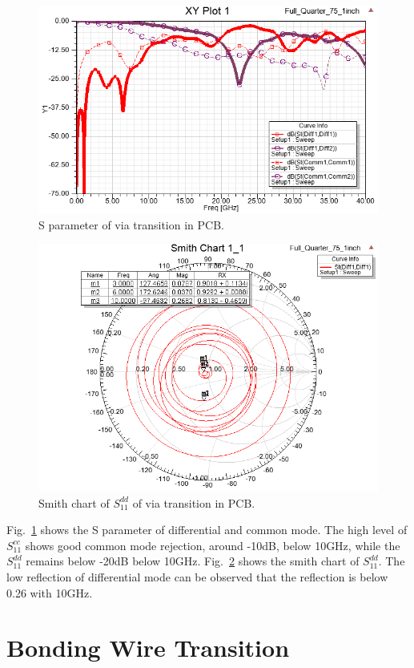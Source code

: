 \documentclass{pj}
\begin{document}
\begin{figure}[htbp!]
	\centering
	\includegraphics[width=0.8\columnwidth]{./img/PCB/Via_Transition/S_parameter.png}
	\caption{S parameter of via transition in PCB.}
	\label{fig:pcb_via_tran_S} %
\end{figure}

\begin{figure}[htbp!]
	\centering
	\includegraphics[width=0.8\columnwidth]{./img/PCB/Via_Transition/via_transition_smith.png}
	\caption{Smith chart of $S^{dd}_{11}$ of via transition in PCB.}
	\label{fig:pcb_via_tran_Sdd11_smith} %
\end{figure}

Fig.~\ref{fig:pcb_via_tran_S} shows the S parameter of differential and common mode. The high level of $S^{cc}_{11}$ shows good common mode rejection, around -10dB, below 10GHz, while the $S^{dd}_{11}$ remains below -20dB below 10GHz. Fig.~\ref{fig:pcb_via_tran_Sdd11_smith} shows the smith chart of $S^{dd}_{11}$. The low reflection of differential mode can be observed that the reflection is below 0.26 with 10GHz.


\section{Bonding Wire Transition}
\label{sec:bond_wire}
\end{document}
